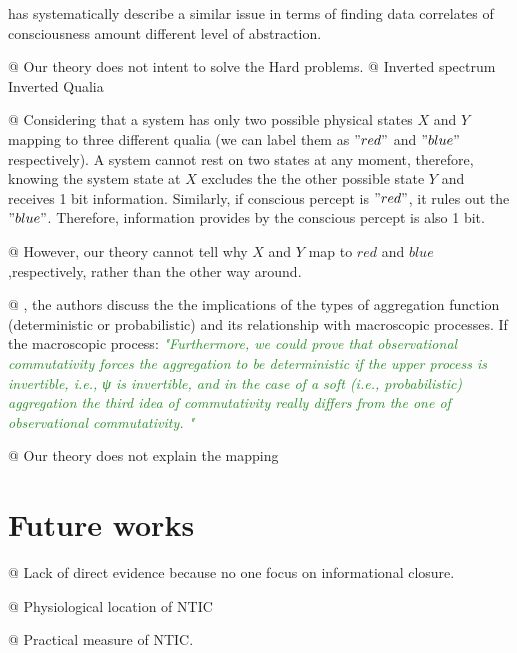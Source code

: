 \documentclass[utf8]{article}
\newenvironment{ants}
			{
			 \begin{easylist}[itemize]
		 	}
			{
			\end{easylist}
			} %
\newcommand{\rewrite}[1]{\textcolor{ForestGreen}{\textit{"#1"}}\newline}
\begin{document}
    \cite{Gamez2016} has systematically describe a similar issue in terms of finding data correlates of consciousness amount different 
    level of abstraction. 
    
    
        \begin{ants}
            @ Our theory does not intent to solve the Hard problems. 
            @ Inverted spectrum Inverted Qualia \citep{Shoemaker1982-SHOTIS, Block1990-BLOIE, Locke1979-LOCTCE-2}
            
            @ Considering that a system has only two possible physical states $X$ and $Y$ mapping to three different qualia (we can label them as $"red"$ and $"blue"$ respectively). A system cannot rest on two states at any moment, therefore, knowing the system state at $X$ excludes the the other possible state $Y$ and receives 1 bit information. Similarly, if conscious percept is $"red"$, it rules out the $"blue"$. Therefore, information provides by the conscious percept is also 1 bit. 
            
            @ However, our theory cannot tell why $X$ and $Y$ map to $red$ and $blue$ ,respectively, rather than the other way around. 
            
            @ \cite{PFANTE.2014}, the authors discuss the the implications of the types of aggregation function (deterministic or probabilistic) and its relationship with macroscopic processes. If the macroscopic process: \rewrite{Furthermore, we could prove that observational commutativity forces the aggregation to be deterministic if the upper process is invertible, i.e., ψ is invertible, and in the case of a soft (i.e., probabilistic) aggregation the third idea of commutativity really differs from the one of observational commutativity. } 
            
            
            
            @ Our theory does not explain the mapping
        \end{ants}
    
    
	\section{Future works}
		\begin{ants}

			@ Lack of direct evidence because no one focus on informational closure.
			
			@ Physiological location of NTIC
			
			@ Practical measure of NTIC. 

		\end{ants}
\end{document}
